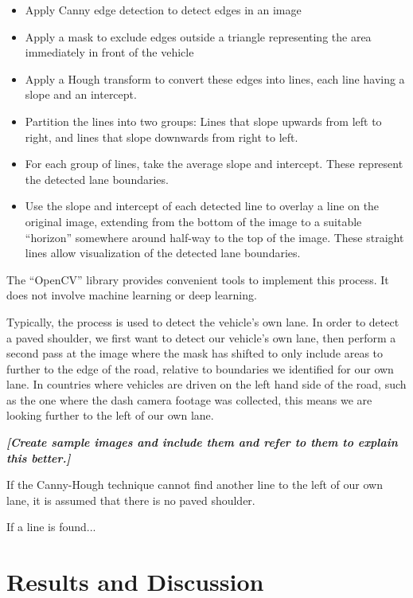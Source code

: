 \documentclass[11pt,twoside]{report}
\newcommand{\remark}[1]{{\bf \em [\marginpar{$\Leftarrow$}#1]}}
\begin{document}
\begin{itemize}
\item{Apply Canny edge detection to detect edges in an image \cite{canny}}
\item{Apply a mask to exclude edges outside a triangle representing the area immediately in front of the vehicle}
\item{Apply a Hough transform \cite{hough} to convert these edges into lines, each line having a slope and an intercept.}
\item{Partition the lines into two groups:  Lines that slope upwards from left to right, and lines that slope downwards from right to left.}
\item{For each group of lines, take the average slope and intercept.  These represent the detected lane boundaries.}
\item{Use the slope and intercept of each detected line to overlay a line on the original image, extending from the bottom of the image to a suitable ``horizon'' somewhere around half-way to the top of the image.  These straight lines allow visualization of the detected lane boundaries.}
\end{itemize}

The ``OpenCV'' library provides convenient tools to implement this process.  It does not involve machine learning or deep learning.

Typically, the process is used to detect the vehicle's own lane.  In order to detect a paved shoulder, we first want to detect our vehicle's own lane, then perform a second pass at the image where the mask has shifted to only include areas to further to the edge of the road, relative to boundaries we identified for our own lane.  In countries where vehicles are driven on the left hand side of the road, such as the one where the dash camera footage was collected, this means we are looking further to the left of our own lane.

\remark{Create sample images and include them and refer to them to explain this better.}

If the Canny-Hough technique cannot find another line to the left of our own lane, it is assumed that there is no paved shoulder.

If a line is found...



\chapter{Results and Discussion}
\label{s:results}
\end{document}
